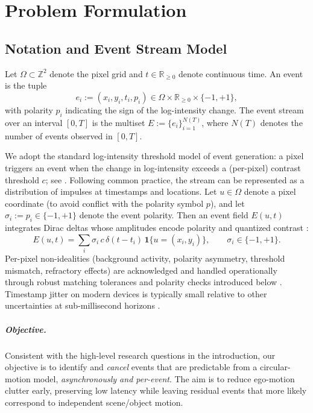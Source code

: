 \chapter{Problem Formulation}\label{chap:problem}

\section{Notation and Event Stream Model}
Let $\Omega \subset \mathbb{Z}^2$ denote the pixel grid and $t \in \mathbb{R}_{\ge 0}$ denote continuous time. An event is the tuple
\[
e_i := (x_i, y_i, t_i, p_i) \in \Omega \times \mathbb{R}_{\ge 0} \times \{-1, +1\},
\]
with polarity $p_i$ indicating the sign of the log-intensity change. The event stream over an interval $[0,T]$ is the multiset $E := \{e_i\}_{i=1}^{N(T)}$, where $N(T)$ denotes the number of events observed in $[0,T]$.

We adopt the standard log-intensity threshold model of event generation: a pixel triggers an event when the change in log-intensity exceeds a (per-pixel) contrast threshold $c$; see \cite{Lichtsteiner2008DVS,Brandli2014DAVIS,Posch2014Retinomorphic,Gallego2020Survey}. Following common practice, the stream can be represented as a distribution of impulses at timestamps and locations. Let $u\in\Omega$ denote a pixel coordinate (to avoid conflict with the polarity symbol $p$), and let $\sigma_i := p_i\in\{-1,+1\}$ denote the event polarity. Then an event field $E(u,t)$ integrates Dirac deltas whose amplitudes encode polarity and quantized contrast \cite{Scheerlinck2021Thesis,Wang2025Thesis}:
\begin{equation}
E(u,t) = \sum_{i} \sigma_i\,c\,\delta\!\left(t - t_i\right)\,\mathbf{1}\{u=(x_i,y_i)\}, \qquad \sigma_i \in \{-1,+1\}.
\label{eq:event-field}
\end{equation}
Per-pixel non-idealities (background activity, polarity asymmetry, threshold mismatch, refractory effects) are acknowledged and handled operationally through robust matching tolerances and polarity checks introduced below \cite{Brandli2014DAVIS,Delbruck2020Handbook,Gallego2020Survey}. Timestamp jitter on modern devices is typically small relative to other uncertainties at sub-millisecond horizons \cite{Wang2025Thesis}.

\paragraph{Objective.}
Consistent with the high-level research questions in the introduction, our objective is to identify and \emph{cancel} events that are predictable from a circular-motion model, \emph{asynchronously and per-event}. The aim is to reduce ego-motion clutter early, preserving low latency while leaving residual events that more likely correspond to independent scene/object motion.

